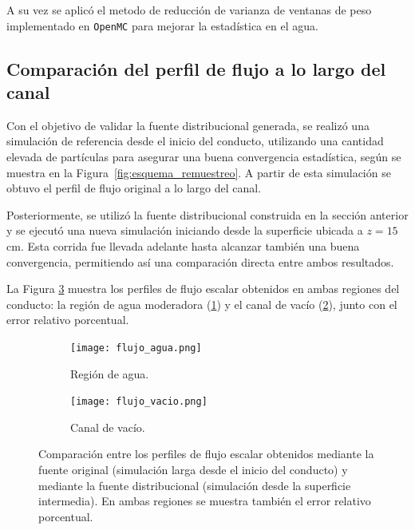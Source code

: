 A su vez se aplicó el metodo de reducción de varianza de ventanas de peso implementado en \texttt{OpenMC} para mejorar la estadística en el agua.

\subsection{Comparación del perfil de flujo a lo largo del canal}

Con el objetivo de validar la fuente distribucional generada, se realizó una simulación de referencia desde el inicio del conducto, utilizando una cantidad elevada de partículas para asegurar una buena convergencia estadística, según se muestra en la Figura~\ref{fig:esquema_remuestreo}. A partir de esta simulación se obtuvo el perfil de flujo original a lo largo del canal.

Posteriormente, se utilizó la fuente distribucional construida en la sección anterior y se ejecutó una nueva simulación iniciando desde la superficie ubicada a $z = 15$cm. Esta corrida fue llevada adelante hasta alcanzar también una buena convergencia, permitiendo así una comparación directa entre ambos resultados.

La Figura \ref{fig:flujo_comparacion} muestra los perfiles de flujo escalar obtenidos en ambas regiones del conducto: la región de agua moderadora (\ref{fig:flujo_agua}) y el canal de vacío (\ref{fig:flujo_vacio}), junto con el error relativo porcentual.

\begin{figure}[H]
    \centering
    \begin{subfigure}[t]{0.48\textwidth}
        \centering
        \texttt{[image: flujo\_agua.png]}
        \caption{Región de agua.}
        \label{fig:flujo_agua}
    \end{subfigure}
    \hfill
    \begin{subfigure}[t]{0.48\textwidth}
        \centering
        \texttt{[image: flujo\_vacio.png]}
        \caption{Canal de vacío.}
        \label{fig:flujo_vacio}
    \end{subfigure}
    \caption{Comparación entre los perfiles de flujo escalar obtenidos mediante la fuente original (simulación larga desde el inicio del conducto) y mediante la fuente distribucional (simulación desde la superficie intermedia). En ambas regiones se muestra también el error relativo porcentual.}
    \label{fig:flujo_comparacion}
\end{figure}

